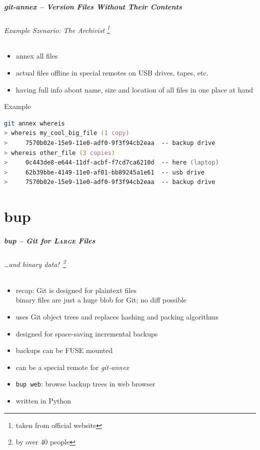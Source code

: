\documentclass[english,hyperref={pdfpagelabels=false},aspectratio=1610]{beamer}
\begin{document}
\begin{frame}[fragile]
  \frametitle{git-annex -- Version Files Without Their Contents}
  \framesubtitle{Example Szenario: The Archivist \footnote{\tiny taken from official website}}
  \begin{itemize}
    \item annex all files
    \item actual files offline in special remotes on USB drives, tapes, etc.
    \item having full info about name, size and location of all files in one place at hand
  \end{itemize}
  
  \begin{block}{Example}
    \vspace{-0.75em}
    \begin{lstlisting}[language=zsh]
git annex whereis
> whereis my_cool_big_file (1 copy)
>     7570b02e-15e9-11e0-adf0-9f3f94cb2eaa  -- backup drive
> whereis other_file (3 copies)
>     0c443de8-e644-11df-acbf-f7cd7ca6210d  -- here (laptop)
>     62b39bbe-4149-11e0-af01-bb89245a1e61  -- usb drive
>     7570b02e-15e9-11e0-adf0-9f3f94cb2eaa  -- backup drive
    \end{lstlisting}
    \vspace{-0.75em}
  \end{block}
\end{frame}



\part{bup}
\makepart

\begin{frame}[label=bup]
  \frametitle{bup -- Git for \textsc{Large} Files}
  \framesubtitle{\dots and binary data!~\footnote{\tiny by over 40 people}}
  \begin{itemize}
    \item recap: Git is designed for plaintext files\\
      {\scriptsize binary files are just a huge blob for Git; no diff possible}
    \item uses Git object trees and replaces hashing and packing algorithms
    \item designed for space-saving incremental backups
    \item backups can be FUSE mounted
    \item can be a special remote for \textit{git-annex}
    \item \texttt{bup web}: browse backup trees in web browser
    \item written in Python
  \end{itemize}
\end{frame}
\end{document}
